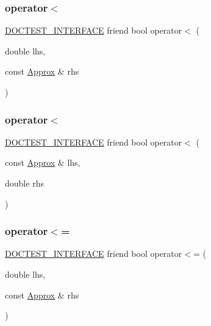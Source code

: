 \subsubsection{\texorpdfstring{operator$<$}{operator<}\hspace{0.1cm}{\footnotesize\ttfamily [1/2]}}
{\footnotesize\ttfamily \hyperlink{doctest_8h_a9c16ffc635ec47f07797d21ede26b1a5}{D\+O\+C\+T\+E\+S\+T\+\_\+\+I\+N\+T\+E\+R\+F\+A\+CE} friend bool operator$<$ (\begin{DoxyParamCaption}\item[{double}]{lhs,  }\item[{const \hyperlink{classdoctest_1_1_approx}{Approx} \&}]{rhs }\end{DoxyParamCaption})\hspace{0.3cm}{\ttfamily [friend]}}

\mbox{\label{classdoctest_1_1_approx_a54ce2536ed164b79688f43e373dcbf7b}} 
\subsubsection{\texorpdfstring{operator$<$}{operator<}\hspace{0.1cm}{\footnotesize\ttfamily [2/2]}}
{\footnotesize\ttfamily \hyperlink{doctest_8h_a9c16ffc635ec47f07797d21ede26b1a5}{D\+O\+C\+T\+E\+S\+T\+\_\+\+I\+N\+T\+E\+R\+F\+A\+CE} friend bool operator$<$ (\begin{DoxyParamCaption}\item[{const \hyperlink{classdoctest_1_1_approx}{Approx} \&}]{lhs,  }\item[{double}]{rhs }\end{DoxyParamCaption})\hspace{0.3cm}{\ttfamily [friend]}}

\mbox{\label{classdoctest_1_1_approx_af2fef67cf4508a446eeaf38dafae661f}} 
\subsubsection{\texorpdfstring{operator$<$=}{operator<=}\hspace{0.1cm}{\footnotesize\ttfamily [1/2]}}
{\footnotesize\ttfamily \hyperlink{doctest_8h_a9c16ffc635ec47f07797d21ede26b1a5}{D\+O\+C\+T\+E\+S\+T\+\_\+\+I\+N\+T\+E\+R\+F\+A\+CE} friend bool operator$<$= (\begin{DoxyParamCaption}\item[{double}]{lhs,  }\item[{const \hyperlink{classdoctest_1_1_approx}{Approx} \&}]{rhs }\end{DoxyParamCaption})\hspace{0.3cm}{\ttfamily [friend]}}

